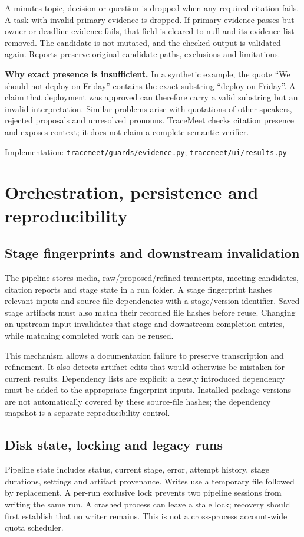 \documentclass[11pt,a4paper]{article}
\newcommand{\code}[1]{\nolinkurl{#1}}
\newcommand{\src}[1]{\par{\footnotesize\raggedright\textcolor{accent}{Implementation:} #1\par}}
\begin{document}
A minutes topic, decision or question is dropped when any required citation fails. A task with invalid primary evidence is dropped. If primary evidence passes but owner or deadline evidence fails, that field is cleared to null and its evidence list removed. The candidate is not mutated, and the checked output is validated again. Reports preserve original candidate paths, exclusions and limitations.

\textbf{Why exact presence is insufficient.} In a synthetic example, the quote ``We should not deploy on Friday'' contains the exact substring ``deploy on Friday''. A claim that deployment was approved can therefore carry a valid substring but an invalid interpretation. Similar problems arise with quotations of other speakers, rejected proposals and unresolved pronouns. TraceMeet checks citation presence and exposes context; it does not claim a complete semantic verifier.
\src{\code{tracemeet/guards/evidence.py}; \code{tracemeet/ui/results.py}}

\section{Orchestration, persistence and reproducibility}
\subsection{Stage fingerprints and downstream invalidation}
The pipeline stores media, raw/proposed/refined transcripts, meeting candidates, citation reports and stage state in a run folder. A stage fingerprint hashes relevant inputs and source-file dependencies with a stage/version identifier. Saved stage artifacts must also match their recorded file hashes before reuse. Changing an upstream input invalidates that stage and downstream completion entries, while matching completed work can be reused.

This mechanism allows a documentation failure to preserve transcription and refinement. It also detects artifact edits that would otherwise be mistaken for current results. Dependency lists are explicit: a newly introduced dependency must be added to the appropriate fingerprint inputs. Installed package versions are not automatically covered by these source-file hashes; the dependency snapshot is a separate reproducibility control.

\subsection{Disk state, locking and legacy runs}
Pipeline state includes status, current stage, error, attempt history, stage durations, settings and artifact provenance. Writes use a temporary file followed by replacement. A per-run exclusive lock prevents two pipeline sessions from writing the same run. A crashed process can leave a stale lock; recovery should first establish that no writer remains. This is not a cross-process account-wide quota scheduler.
\end{document}
